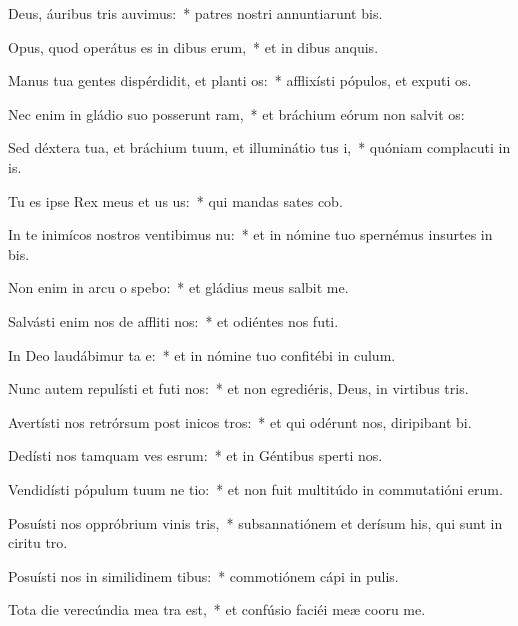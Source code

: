 \item Deus, áuribus tris auvimus:~* patres nostri annuntiarunt bis.
\item Opus, quod operátus es in dibus erum,~* et in dibus anquis.
\item Manus tua gentes dispérdidit, et planti os:~* afflixísti pópulos, et exputi os.
\item Nec enim in gládio suo posserunt ram,~* et bráchium eórum non salvit os:
\item Sed déxtera tua, et bráchium tuum, et illuminátio tus i,~* quóniam complacuti in is.
\item Tu es ipse Rex meus et us us:~* qui mandas sates cob.
\item In te inimícos nostros ventibimus nu:~* et in nómine tuo spernémus insurtes in bis.
\item Non enim in arcu o spebo:~* et gládius meus  salbit me.
\item Salvásti enim nos de affliti nos:~* et odiéntes nos futi.
\item In Deo laudábimur ta e:~* et in nómine tuo confitébi in culum.
\item Nunc autem repulísti et futi nos:~* et non egrediéris, Deus, in virtibus tris.
\item Avertísti nos retrórsum post inicos tros:~* et qui odérunt nos, diripibant bi.
\item Dedísti nos tamquam ves esrum:~* et in Géntibus sperti nos.
\item Vendidísti pópulum tuum ne tio:~* et non fuit multitúdo in commutatióni erum.
\item Posuísti nos oppróbrium vinis tris,~* subsannatiónem et derísum his, qui sunt in ciritu tro.
\item Posuísti nos in similidinem tibus:~* commotiónem cápi in pulis.
\item Tota die verecúndia mea tra  est,~* et confúsio faciéi meæ cooru me.
